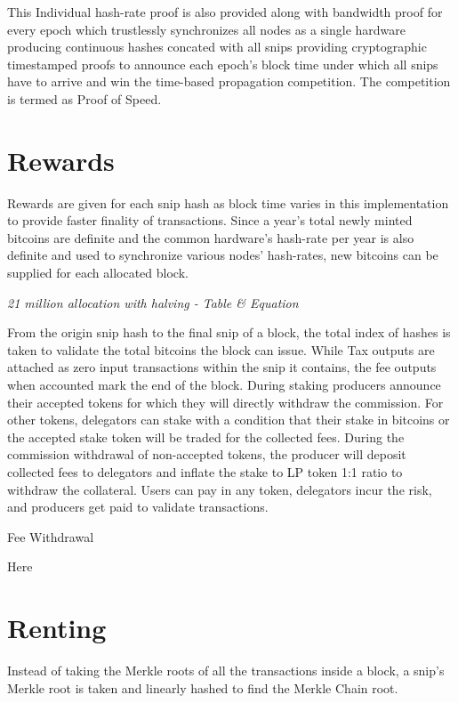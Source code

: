 \documentclass[a4paper,10pt]{article}
\begin{document}
This Individual hash-rate proof is also provided along with bandwidth proof for every epoch which trustlessly synchronizes all nodes as a single hardware producing continuous hashes concated with all snips providing cryptographic timestamped proofs to announce each epoch's block time under which all snips have to arrive and win the time-based propagation competition. The competition is termed as Proof of Speed.

\section{Rewards}
Rewards are given for each snip hash as block time varies in this implementation to provide faster finality of transactions. Since a year's total newly minted bitcoins are definite and the common hardware's hash-rate per year is also definite and used to synchronize various nodes' hash-rates, new bitcoins can be supplied for each allocated block. 

\textit{21 million allocation with halving - Table \& Equation}

From the origin snip hash to the final snip of a block, the total index of hashes is taken to validate the total bitcoins the block can issue. While Tax outputs are attached as zero input transactions within the snip it contains, the fee outputs when accounted mark the end of the block. During staking producers announce their accepted tokens for which they will directly withdraw the commission. For other tokens, delegators can stake with a condition that their stake in bitcoins or the accepted stake token will be traded for the collected fees. During the commission withdrawal of non-accepted tokens, the producer will deposit collected fees to delegators and inflate the stake to LP token 1:1 ratio to withdraw the collateral. Users can pay in any token, delegators incur the risk, and producers get paid to validate transactions.


\begin{algorithm}
\caption{Fee Withdrawal}
Here
\end{algorithm}

\section{Renting}
Instead of taking the Merkle roots of all the transactions inside a block, a snip's Merkle root is taken and linearly hashed to find the Merkle Chain root. \\
\end{document}
